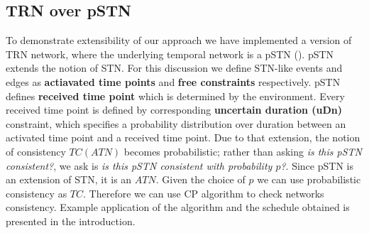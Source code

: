 \subsection{TRN over pSTN}
To demonstrate extensibility of our approach we have implemented a version of TRN network, where the underlying temporal network is a pSTN (\cite{Fang2014}). pSTN extends the notion of STN. For this discussion we define STN-like events and edges as \textbf{actiavated time points} and \textbf{free constraints} respectively. pSTN defines \textbf{received time point} which is determined by the environment. Every received time point is defined by corresponding \textbf{uncertain duration (uDn)} constraint, which specifies a probability distribution over duration between an activated time point and a received time point. Due to that extension, the notion of consistency $TC(ATN)$ becomes probabilistic; rather than asking \textit{is this pSTN consistent?}, we ask is \textit{is this pSTN consistent with probability $p$?}. Since pSTN is an extension of STN, it is an $ATN$. Given the choice of $p$ we can use probabilistic consistency as $TC$. Therefore we can use CP algorithm to check networks consistency. Example application of the algorithm and the schedule obtained is presented in the introduction.
